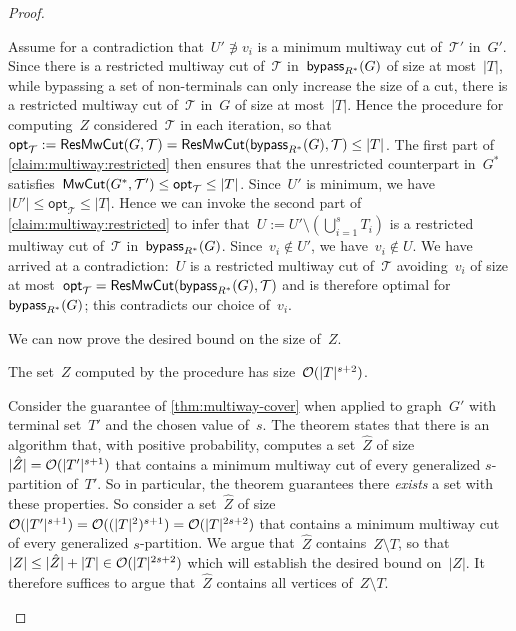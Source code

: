 \begin{proof}
\begin{claimproof}
Assume for a contradiction that~$U' \not \ni v_i$ is a minimum multiway cut of~$\mathcal{T}'$ in~$G'$. Since there is a restricted multiway cut of~$\mathcal{T}$ in~$\mathsf{bypass}_{R^*}(G)$ of size at most~$|T|$, while bypassing a set of non-terminals can only increase the size of a cut, there is a restricted multiway cut of~$\mathcal{T}$ in~$G$ of size at most~$|T|$. Hence the procedure for computing~$Z$ considered~$\mathcal{T}$ in each iteration, so that~$\mathsf{opt}_{\mathcal{T}} := \mathsf{ResMwCut}(G,\mathcal{T}) = \mathsf{ResMwCut}(\mathsf{bypass}_{R^*}(G), \mathcal{T}) \leq |T|$. The first part of \cref{claim:multiway:restricted} then ensures that the unrestricted counterpart in~$G^*$ satisfies~$\mathsf{MwCut}(G^*, \mathcal{T}') \leq \mathsf{opt}_{\mathcal{T}} \leq |T|$. Since~$U'$ is minimum, we have~$|U'| \leq \mathsf{opt}_{\mathcal{T}} \leq |T|$. Hence we can invoke the second part of \cref{claim:multiway:restricted} to infer that~$U := U' \setminus (\bigcup_{i=1}^s T_i)$ is a restricted multiway cut of~$\mathcal{T}$ in~$\mathsf{bypass}_{R^*}(G)$. Since~$v_i \notin U'$, we have~$v_i \notin U$. We have arrived at a contradiction:~$U$ is a restricted multiway cut of~$\mathcal{T}$ avoiding~$v_i$ of size at most~$\mathsf{opt}_{\mathcal{T}} = \mathsf{ResMwCut}(\mathsf{bypass}_{R^*}(G), \mathcal{T})$ and is therefore optimal for~$\mathsf{bypass}_{R^*}(G)$; this contradicts our choice of~$v_i$.
\end{claimproof}

We can now prove the desired bound on the size of~$Z$.

\begin{claim}
The set~$Z$ computed by the procedure has size~$\mathcal{O}(|T|^{s+2})$.
\end{claim}
\begin{claimproof}
Consider the guarantee of \cref{thm:multiway-cover} when applied to graph~$G'$ with terminal set~$T'$ and the chosen value of~$s$. The theorem states that there is an algorithm that, with positive probability, computes a set~$\hat{Z}$ of size~$|\hat{Z}| = \mathcal{O}(|T'|^{s+1})$ that contains a minimum multiway cut of every generalized $s$-partition of~$T'$. So in particular, the theorem guarantees there \emph{exists} a set with these properties. So consider a set~$\hat{Z}$ of size~$\mathcal{O}(|T'|^{s+1}) = \mathcal{O}((|T|^2)^{s+1}) = \mathcal{O}(|T|^{2s+2})$ that contains a minimum multiway cut of every generalized $s$-partition. We argue that~$\hat{Z}$ contains~$Z \setminus T$, so that~$|Z| \leq |\hat{Z}| + |T| \in \mathcal{O}(|T|^{2s+2})$ which will establish the desired bound on~$|Z|$. It therefore suffices to argue that~$\hat{Z}$ contains all vertices of~$Z \setminus T$.


\end{claimproof}
\end{proof}

